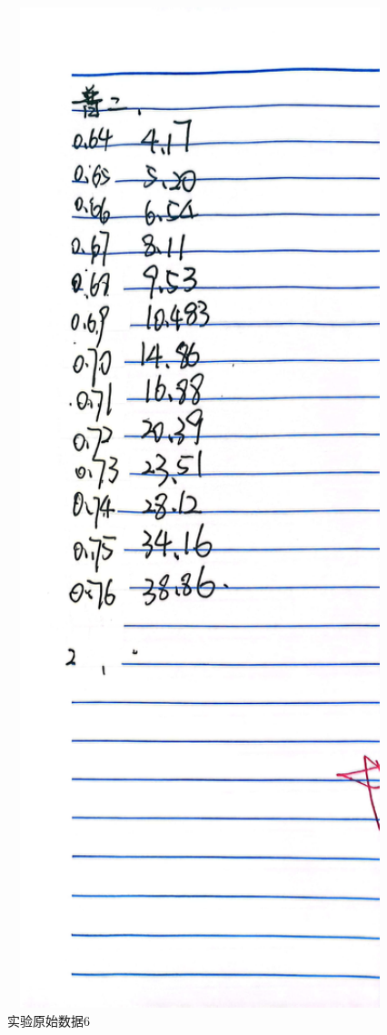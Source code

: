 \documentclass{ctexart}
\begin{document}
\begin{figure}[H]
  \centering
  \includegraphics[width=1\textwidth,height=0.8\textheight]{putong3.jpg}
  \caption{实验原始数据6}\label{putong3}
\end{figure}
\newpage
\end{document}
